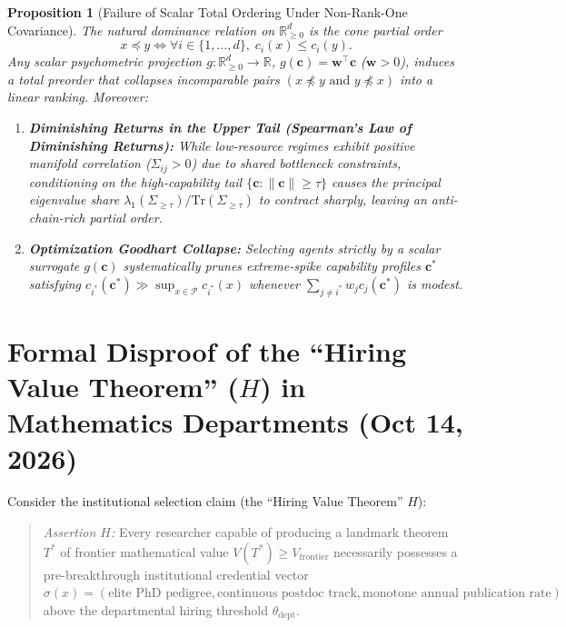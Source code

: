 \documentclass[11pt]{article}
\newtheorem{proposition}[theorem]{Proposition}
\begin{document}
\begin{proposition}[Failure of Scalar Total Ordering Under Non-Rank-One Covariance]
The natural dominance relation on $\mathbb{R}_{\ge 0}^d$ is the cone partial order
\[
x \preceq y \iff \forall i \in \{1,\dots,d\},\; c_i(x) \le c_i(y).
\]
Any scalar psychometric projection $g : \mathbb{R}_{\ge 0}^d \to \mathbb{R}$, $g(\mathbf{c}) = \mathbf{w}^\top \mathbf{c}$ ($\mathbf{w} > 0$), induces a total preorder that collapses incomparable pairs $(x \not\preceq y \text{ and } y \not\preceq x)$ into a linear ranking. Moreover:
\begin{enumerate}
  \item \textbf{Diminishing Returns in the Upper Tail (Spearman's Law of Diminishing Returns):} While low-resource regimes exhibit positive manifold correlation ($\Sigma_{ij} > 0$) due to shared bottleneck constraints, conditioning on the high-capability tail $\{\mathbf{c} : \|\mathbf{c}\| \ge \tau\}$ causes the principal eigenvalue share $\lambda_1(\Sigma_{\ge \tau}) / \mathrm{Tr}(\Sigma_{\ge \tau})$ to contract sharply, leaving an anti-chain-rich partial order.
  \item \textbf{Optimization Goodhart Collapse:} Selecting agents strictly by a scalar surrogate $g(\mathbf{c})$ systematically prunes extreme-spike capability profiles $\mathbf{c}^*$ satisfying $c_{i^*}(\mathbf{c}^*) \gg \sup_{x \in \mathcal{P}} c_{i^*}(x)$ whenever $\sum_{j \neq i^*} w_j c_j(\mathbf{c}^*)$ is modest.
\end{enumerate}
\end{proposition}

\section{Formal Disproof of the ``Hiring Value Theorem'' ($H$) in Mathematics Departments (Oct 14, 2026)}
Consider the institutional selection claim (the ``Hiring Value Theorem'' $H$):
\begin{quote}
\emph{Assertion $H$:} Every researcher capable of producing a landmark theorem $T^*$ of frontier mathematical value $V(T^*) \ge V_{\mathrm{frontier}}$ necessarily possesses a pre-breakthrough institutional credential vector $\sigma(x) = (\text{elite PhD pedigree}, \text{continuous postdoc track}, \text{monotone annual publication rate})$ above the departmental hiring threshold $\theta_{\mathrm{dept}}$.
\end{quote}
\end{document}
